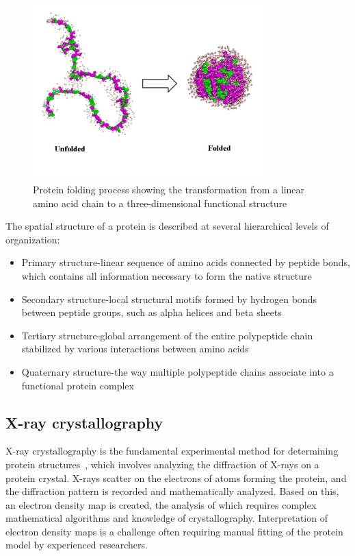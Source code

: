 \begin{figure}[htbp]
    \centering
    \includegraphics[width=0.8\textwidth]{images/folded.jpg}
    \caption{Protein folding process showing the transformation from a linear amino acid chain to a three-dimensional functional structure}
    \label{fig:protein-folding}
\end{figure}

The spatial structure of a protein is described at several hierarchical levels of organization:

\begin{itemize}
    \item Primary structure-linear sequence of amino acids connected by peptide bonds, which contains all information necessary to form the native structure
    \item Secondary structure-local structural motifs formed by hydrogen bonds between peptide groups, such as alpha helices and beta sheets
    \item Tertiary structure-global arrangement of the entire polypeptide chain stabilized by various interactions between amino acids
    \item Quaternary structure-the way multiple polypeptide chains associate into a functional protein complex
\end{itemize}

\subsection{X-ray crystallography}
X-ray crystallography is the fundamental experimental method for determining protein structures~\cite{xray_crystallography}, which involves analyzing the diffraction of X-rays on a protein crystal.
X-rays scatter on the electrons of atoms forming the protein, and the diffraction pattern is recorded and mathematically analyzed.
Based on this, an electron density map is created, the analysis of which requires complex mathematical algorithms and knowledge of crystallography.
Interpretation of electron density maps is a challenge often requiring manual fitting of the protein model by experienced researchers.

